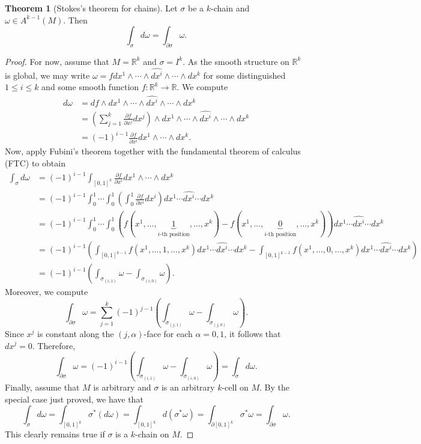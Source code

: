 \documentclass[10pt,letterpaper,cm]{nupset}
\theoremstyle{definition}
\theoremstyle{theorem}
\newtheorem{theorem}[definition]{Theorem}
\theoremstyle{remark}
\newcommand{\R}{\mathbb R}
\newcommand{\1}{\mathbf{1}}
\newcommand{\0}{\vec 0}
\begin{document}
\begin{theorem}[Stokes's theorem for chains]\label{chains}
Let $\sigma$ be a $k$-chain and $\omega \in A^{k-1}(M)$. Then $$\int_{\sigma} d\omega = \int_{\partial{\sigma}} \omega.$$
\end{theorem}
\begin{proof}
For now, assume that $M= \R^k$ and $\sigma = I^k$. As the smooth structure on $\R^k$ is global, we may write $\omega = fdx^1 \wedge \cdots \wedge \widehat{dx^i} \wedge \cdots \wedge dx^k$ for some distinguished $1\leq i \leq k$ and some smooth function $f: \R^k \to \R$. We compute 
\begin{align*}
 d\omega & = df \wedge dx^1 \wedge \cdots \wedge \widehat{dx^i} \wedge \cdots \wedge dx^k
\\ & = \left(\sum_{j=1}^k\frac{\partial{f}}{\partial{x^j}}dx^j \right)\wedge dx^1 \wedge \cdots \wedge \widehat{dx^i} \wedge \cdots \wedge dx^k
\\ & = ({-1})^{i-1} \frac{\partial{f}}{\partial{x^i}}dx^1 \wedge \cdots \wedge dx^k.
\end{align*}
Now, apply Fubini's theorem  together with the fundamental theorem of calculus (FTC) to obtain
\begin{align*}
 \int_{\sigma}d\omega & = ({-1})^{i-1}\int_{\left[0,1\right]^k} \frac{\partial{f}}{\partial{x^i}}dx^1 \wedge \cdots \wedge dx^k
\\ & = ({-1})^{i-1}\int_0^1 \cdots \int_0^1 \left(\int_0^1  \frac{\partial{f}}{\partial{x^i}}dx^i \right)dx^1 \cdots \widehat{dx^i}  \cdots dx^k
\\ & = ({-1})^{i-1}\int_0^1 \cdots \int_0^1(f(x^1, \ldots, \underbrace{1}_{i\text{-th position}}, \ldots, x^k) - f(x^1, \ldots, \underbrace{0}_{i\text{-th position}}, \ldots, x^k))dx^1 \cdots \widehat{dx^i}  \cdots dx^k
\\ & =  ({-1})^{i-1}\left( \int_{\left[0,1\right]^{k-1}} f(x^1, \ldots, 1, \ldots, x^k)dx^1 \cdots \widehat{dx^i}  \cdots dx^k -\int_{\left[0,1\right]^{k-1}}f(x^1, \ldots, 0, \ldots, x^k)dx^1 \cdots \widehat{dx^i}  \cdots dx^k \right)
\\ & = ({-1})^{i-1}\left(\int_{\sigma_{(i, 1)}}\omega - \int_{\sigma_{(i, 0)}}\omega \right) .
\end{align*}
Moreover, we compute
$$ \int_{\partial{\sigma}}\omega = \sum_{j=1}^k({-1})^{j-1}\left(\int_{\sigma_{(j, 1)}}\omega - \int_{\sigma_{(j, 0)}}\omega \right).$$
Since $x^j$ is constant along the $(j, \alpha)$-face for each $\alpha = 0, 1$, it follows that $dx^j = 0$. Therefore, $$ \int_{\partial{\sigma}}\omega =   ({-1})^{i-1}\left(\int_{\sigma_{(i, 1)}}\omega - \int_{\sigma_{(i, 0)}}\omega \right) = \int_{\sigma} d\omega.$$
Finally, assume that $M$ is arbitrary and $\sigma $ is an arbitrary $k$-cell on $M$. By the special case just proved, we have that
$$  \int_{\sigma}d\omega = \int_{\left[0,1\right]^k}\sigma^{\ast}(d\omega) = \int_{\left[0,1\right]^k}d(\sigma^{\ast}\omega) = \int_{\partial{\left[0,1\right]^k}}\sigma^{\ast} \omega = \int_{\partial{\sigma}} \omega .$$
This clearly remains true if $\sigma$ is a $k$-chain on $M$.
\end{proof}
\end{document}
